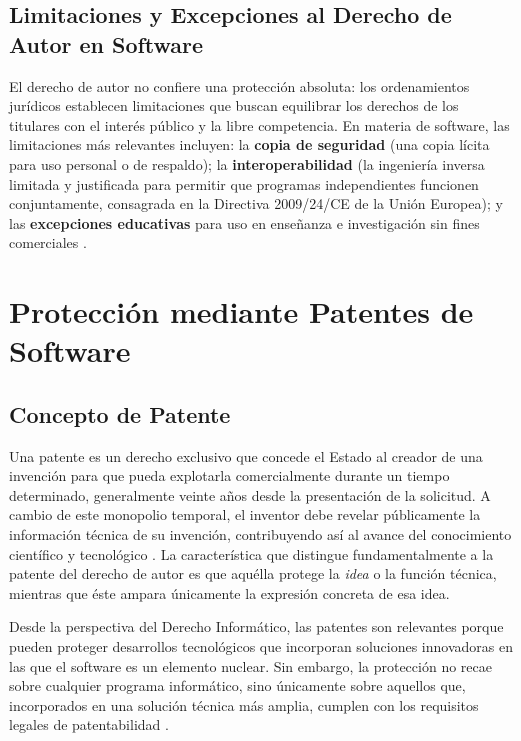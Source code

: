 \documentclass[11pt,a4paper]{report}
\begin{document}
\section{Limitaciones y Excepciones al Derecho de Autor en Software}

El derecho de autor no confiere una protección absoluta: los ordenamientos jurídicos establecen limitaciones que buscan equilibrar los derechos de los titulares con el interés público y la libre competencia. En materia de software, las limitaciones más relevantes incluyen: la \textbf{copia de seguridad} (una copia lícita para uso personal o de respaldo); la \textbf{interoperabilidad} (la ingeniería inversa limitada y justificada para permitir que programas independientes funcionen conjuntamente, consagrada en la Directiva 2009/24/CE de la Unión Europea); y las \textbf{excepciones educativas} para uso en enseñanza e investigación sin fines comerciales \citep{euipo2022}.

\newpage

\chapter{Protección mediante Patentes de Software}

\section{Concepto de Patente}

Una patente es un derecho exclusivo que concede el Estado al creador de una invención para que pueda explotarla comercialmente durante un tiempo determinado, generalmente veinte años desde la presentación de la solicitud. A cambio de este monopolio temporal, el inventor debe revelar públicamente la información técnica de su invención, contribuyendo así al avance del conocimiento científico y tecnológico \citep{ompi2024}. La característica que distingue fundamentalmente a la patente del derecho de autor es que aquélla protege la \emph{idea} o la función técnica, mientras que éste ampara únicamente la expresión concreta de esa idea.

Desde la perspectiva del Derecho Informático, las patentes son relevantes porque pueden proteger desarrollos tecnológicos que incorporan soluciones innovadoras en las que el software es un elemento nuclear. Sin embargo, la protección no recae sobre cualquier programa informático, sino únicamente sobre aquellos que, incorporados en una solución técnica más amplia, cumplen con los requisitos legales de patentabilidad \citep{indecopi2023}.
\end{document}
